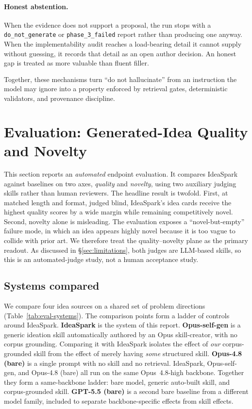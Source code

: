 \documentclass[10pt,a4paper]{article}
\begin{document}
\paragraph{Honest abstention.} When the evidence does not support a proposal, the run stops with a \texttt{do\_not\_generate} or \texttt{phase\_3\_failed} report rather than producing one anyway. When the implementability audit reaches a load-bearing detail it cannot supply without guessing, it records that detail as an open author decision. An honest gap is treated as more valuable than fluent filler.

Together, these mechanisms turn ``do not hallucinate'' from an instruction the model may ignore into a property enforced by retrieval gates, deterministic validators, and provenance discipline.

\section{Evaluation: Generated-Idea Quality and Novelty}
\label{sec:evaluation}

This section reports an \emph{automated} endpoint evaluation. It compares IdeaSpark against baselines on two axes, \emph{quality} and \emph{novelty}, using two auxiliary judging skills rather than human reviewers. The headline result is twofold. First, at matched length and format, judged blind, IdeaSpark's idea cards receive the highest quality scores by a wide margin while remaining competitively novel. Second, novelty alone is misleading. The evaluation exposes a ``novel-but-empty'' failure mode, in which an idea appears highly novel because it is too vague to collide with prior art. We therefore treat the quality--novelty plane as the primary readout. As discussed in \S\ref{sec:limitations}, both judges are LLM-based skills, so this is an automated-judge study, not a human acceptance study.

\subsection{Systems compared}
\label{subsec:eval-systems}

We compare four idea sources on a shared set of problem directions (Table~\ref{tab:eval-systems}). The comparison points form a ladder of controls around IdeaSpark. \textbf{IdeaSpark} is the system of this report. \textbf{Opus-self-gen} is a generic ideation skill automatically authored by an Opus skill-creator, with no corpus grounding. Comparing it with IdeaSpark isolates the effect of \emph{our} corpus-grounded skill from the effect of merely having \emph{some} structured skill. \textbf{Opus-4.8 (bare)} is a single prompt with no skill and no retrieval. IdeaSpark, Opus-self-gen, and Opus-4.8 (bare) all run on the same Opus~4.8-high backbone. Together they form a same-backbone ladder: bare model, generic auto-built skill, and corpus-grounded skill. \textbf{GPT-5.5 (bare)} is a second bare baseline from a different model family, included to separate backbone-specific effects from skill effects.
\end{document}
